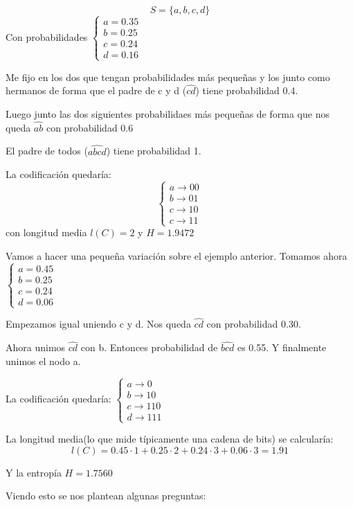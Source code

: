 \begin{example}
	$$S = \{ a , b , c , d\}$$
	Con probabilidades
	$\begin{cases}
	a = 0.35\\b = 0.25\\ c= 0.24\\ d = 0.16
	\end{cases}$
	
	 Me fijo en los dos que tengan probabilidades más pequeñas y los junto como hermanos de forma que el padre de c y d ($\widehat{cd}$) tiene probabilidad 0.4.
	 
	 Luego junto las dos siguientes probabilidaes más pequeñas de forma que nos queda $\widehat{ab}$ con probabilidad 0.6
	 
	 El padre de todos ($\widehat{abcd}$) tiene probabilidad 1.
	 
	 La codificación quedaría:
	 $$\begin{cases}
	 a \rightarrow 00\\ b \rightarrow 01 \\c \rightarrow 10 \\ c \rightarrow 11
	 \end{cases}$$
	 con longitud media $l(C) = 2$ y $H = 1.9472$
	 
	  
	
	
\end{example}

\begin{example}
	Vamos a hacer una pequeña variación sobre el ejemplo anterior.
	Tomamos ahora $\begin{cases}
	a = 0.45 \\ b = 0.25\\c = 0.24 \\ d = 0.06
	\end{cases}$
	
	Empezamos igual uniendo c y d. Nos queda $\widehat{cd}$ con probabilidad 0.30.
	
	Ahora unimos $\widehat{cd}$ con b. Entonces probabilidad de $ \widehat{bcd}$ es 0.55. Y finalmente unimos el nodo a.
	
	La codificación quedaría: $\begin{cases}
	a \rightarrow 0 \\ b \rightarrow 10 \\ c \rightarrow 110\\ d \rightarrow 111
	\end{cases}$
	
	La longitud media(lo que mide típicamente una cadena de bits) se calcularía:
	$$l(C) = 0.45 \cdot 1 + 0.25 \cdot 2 + 0.24 \cdot 3 + 0.06 \cdot 3 = 1.91$$
	
	Y la entropía $H = 1.7560$
\end{example}
Viendo esto se nos plantean algunas preguntas:

